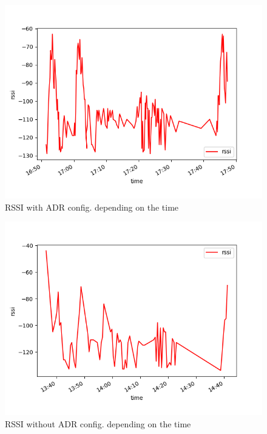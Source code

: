 \begin{figure}[htbp]
    \includegraphics[width=\linewidth]{Figure_2.png}
    \caption{RSSI with ADR config. depending on the time}
    \label{chap:fifth:fig:2}
\end{figure}

\begin{figure}[htbp]
    \includegraphics[width=\linewidth]{Figure_2NoADR.png}
    \caption{RSSI without ADR config. depending on the time}
    \label{chap:fifth:fig:2:noADR}
\end{figure}

